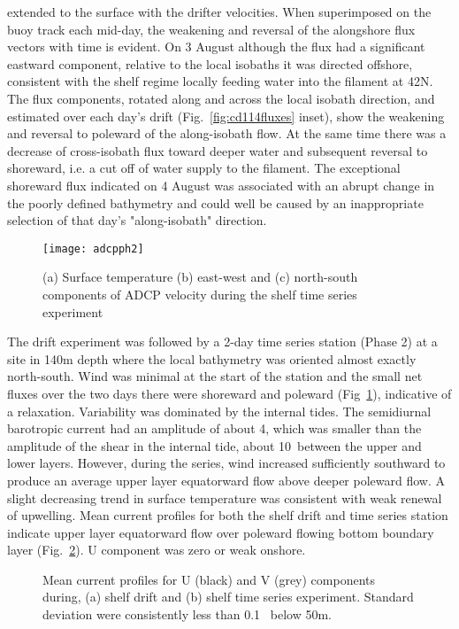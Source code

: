 extended to the surface with the drifter velocities.  When
superimposed on the buoy track each mid-day, the weakening and
reversal of the alongshore flux vectors with time is evident. On 3
August although the flux had a significant eastward component,
relative to the local isobaths it was directed offshore,
consistent with the shelf regime locally feeding water into the
filament at 42\deg N.  The flux components, rotated along and
across the local isobath direction, and estimated over each day's
drift (Fig.~\ref{fig:cd114fluxes} inset), show the weakening and
reversal to poleward of the along-isobath flow. At the same time
there was a decrease of cross-isobath flux toward deeper water and
subsequent reversal to shoreward, i.e. a cut off of water supply
to the filament. The exceptional shoreward flux indicated on 4
August was associated with an abrupt change in the poorly defined
bathymetry and could well be caused by an inappropriate selection
of that day's "along-isobath" direction.
\begin{figure}[t]
\centering %
\texttt{[image: adcpph2]}%
\caption{(a) Surface temperature (b) east-west and (c) north-south
components of ADCP velocity during the shelf time series
experiment}%
\label{fig:cd114adcpph2}%
\end{figure}

The drift experiment was followed by a 2-day time series station
(Phase 2) at a site in 140m depth where the local bathymetry was
oriented almost exactly north-south. Wind was minimal at the start
of the station and the small net fluxes over the two days there
were shoreward and poleward (Fig~\ref{fig:cd114adcpph2}),
indicative of a relaxation. Variability was dominated by the
internal tides. The semidiurnal barotropic current had an
amplitude of about 4\velc, which was smaller than the amplitude of
the shear in the internal tide, about 10\velc\, between the upper
and lower layers. However, during the series, wind increased
sufficiently southward to produce an average upper layer
equatorward flow above deeper poleward flow. A slight decreasing
trend in surface temperature was consistent with weak renewal of
upwelling. Mean current profiles for both the shelf drift and time
series station indicate upper layer equatorward flow over poleward
flowing bottom boundary layer (Fig.~\ref{fig:cd114meancurr}). U
component was zero or weak onshore.
\begin{figure}
\centering %
%
%
\caption{Mean current profiles for U (black) and V (grey)
components during, (a) shelf drift and (b) shelf time series
experiment. Standard deviation were consistently less than 0.1
\vel\, below 50m.}
\label{fig:cd114meancurr}%
\end{figure}

